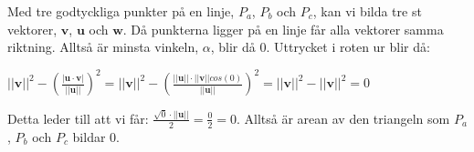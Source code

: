 Med tre godtyckliga punkter på en linje, $P_{a}$, $P_{b}$ och $P_{c}$, kan vi bilda tre st vektorer, $\bm{v}$, $\bm{u}$ och $\bm{w}$.
Då punkterna ligger på en linje får alla vektorer samma riktning.
Alltså är minsta vinkeln, $\alpha$, blir då 0.
Uttrycket i roten ur blir då: 
\begin{center}
    $
    ||\bm{v}||^{2}-(\frac{|\bm{u}\cdot \bm{v}|}{||\bm{u}||})^{2} = 
    ||\bm{v}||^{2}-(\frac{||\bm{u}||\cdot||\bm{v}||cos(0)}{||\bm{u}||})^{2}=
    ||\bm{v}||^{2}-||\bm{v}||^{2}=0
    $
\end{center}
Detta leder till att vi får: $\frac{\sqrt{0}\cdot ||\bm{u}||}{2}=\frac{0}{2}=0$.
Alltså är arean av den triangeln som $P_{a}$, $P_{b}$ och $P_{c}$ bildar 0.